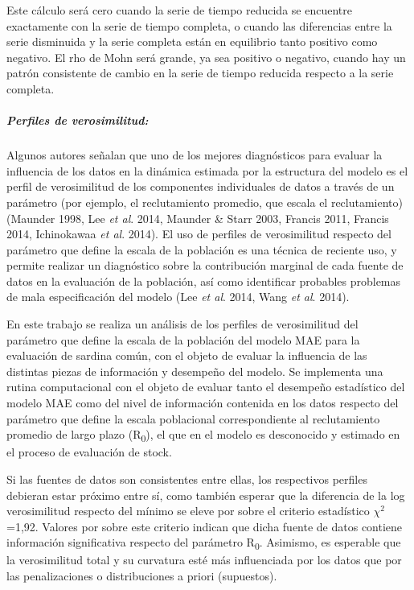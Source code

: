 \documentclass[
  spanish,
]{article}
\begin{document}
Este cálculo será cero cuando la serie de tiempo reducida se encuentre
exactamente con la serie de tiempo completa, o cuando las diferencias
entre la serie disminuida y la serie completa están en equilibrio tanto
positivo como negativo. El rho de Mohn será grande, ya sea positivo o
negativo, cuando hay un patrón consistente de cambio en la serie de
tiempo reducida respecto a la serie completa.

\hypertarget{perfiles-de-verosimilitud}{%
\subparagraph{Perfiles de
verosimilitud:}\label{perfiles-de-verosimilitud}}

Algunos autores señalan que uno de los mejores diagnósticos para evaluar
la influencia de los datos en la dinámica estimada por la estructura del
modelo es el perfil de verosimilitud de los componentes individuales de
datos a través de un parámetro (por ejemplo, el reclutamiento promedio,
que escala el reclutamiento) (Maunder 1998, Lee \emph{et al}. 2014,
Maunder \& Starr 2003, Francis 2011, Francis 2014, Ichinokawaa \emph{et
al}. 2014). El uso de perfiles de verosimilitud respecto del parámetro
que define la escala de la población es una técnica de reciente uso, y
permite realizar un diagnóstico sobre la contribución marginal de cada
fuente de datos en la evaluación de la población, así como identificar
probables problemas de mala especificación del modelo (Lee \emph{et al}.
2014, Wang \emph{et al}. 2014).

En este trabajo se realiza un análisis de los perfiles de verosimilitud
del parámetro que define la escala de la población del modelo MAE para
la evaluación de sardina común, con el objeto de evaluar la influencia
de las distintas piezas de información y desempeño del modelo. Se
implementa una rutina computacional con el objeto de evaluar tanto el
desempeño estadístico del modelo MAE como del nivel de información
contenida en los datos respecto del parámetro que define la escala
poblacional correspondiente al reclutamiento promedio de largo plazo
(R\textsubscript{0}), el que en el modelo es desconocido y estimado en
el proceso de evaluación de stock.

Si las fuentes de datos son consistentes entre ellas, los respectivos
perfiles debieran estar próximo entre sí, como también esperar que la
diferencia de la log verosimilitud respecto del mínimo se eleve por
sobre el criterio estadístico \(\chi^2\)=1,92. Valores por sobre este
criterio indican que dicha fuente de datos contiene información
significativa respecto del parámetro R\textsubscript{0}. Asimismo, es
esperable que la verosimilitud total y su curvatura esté más
influenciada por los datos que por las penalizaciones o distribuciones a
priori (supuestos).
\end{document}
